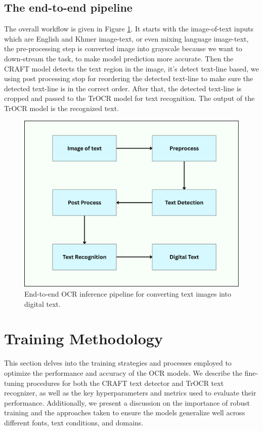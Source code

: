 \subsection{The end-to-end pipeline}
\label{subsec:khmer-ocr-pipeline}

        The overall workflow is given in Figure \ref{fig:trocr-inference-full-pipeline}.
It starts with the image-of-text inputs which are English and
Khmer image-text, or even mixing language image-text, the pre-processing
step is converted image into grayscale because we want to down-stream
the task, to make model prediction more accurate. Then the CRAFT model
detects the text region in the image, it's detect text-line based,
we using post processing stop for reordering the detected text-line
to make sure the detected text-line is in the correct order.
After that, the detected text-line is cropped and passed to the TrOCR
model for text recognition. The output of the TrOCR model is the
recognized text. 
\begin{figure}[H]
    \centering
    \includegraphics[width=\textwidth]{figures/khmerOCR_inference_full_pipeline.png}
    \caption{End-to-end OCR inference pipeline for converting text images into digital text.}
    \label{fig:trocr-inference-full-pipeline}
\end{figure}

\section{Training Methodology}
\label{sec:training}
This section delves into the training strategies and processes employed to optimize 
the performance and accuracy of the OCR models. We describe the fine-tuning procedures 
for both the CRAFT text detector and TrOCR text recognizer, as well as the key 
hyperparameters and metrics used to evaluate their performance. Additionally, we 
present a discussion on the importance of robust training and the approaches taken 
to ensure the models generalize well across different fonts, text conditions, and 
domains.




